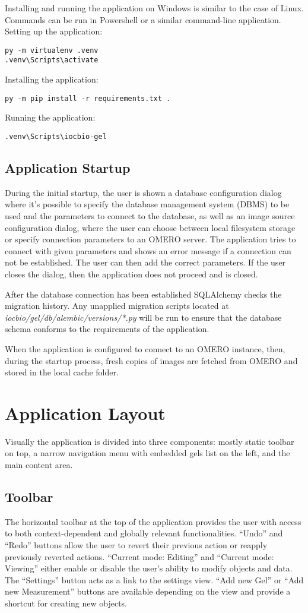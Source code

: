 Installing and running the application on Windows is similar to the case of Linux. Commands can be run in Powershell or a similar command-line application.
Setting up the application:
\begin{verbatim}
py -m virtualenv .venv
.venv\Scripts\activate
\end{verbatim}
Installing the application:
\begin{verbatim}
py -m pip install -r requirements.txt .
\end{verbatim}
Running the application:
\begin{verbatim}
.venv\Scripts\iocbio-gel
\end{verbatim}

\subsection{Application Startup}

During the initial startup, the user is shown a database configuration dialog where it’s possible to specify the database management system (DBMS) to be used and the parameters to connect to the database, as well as an image source configuration dialog, where the user can choose between local filesystem storage or specify connection parameters to an OMERO server. The application tries to connect with given parameters and shows an error message if a connection can not be established. The user can then add the correct parameters. If the user closes the dialog, then the application does not proceed and is closed.

After the database connection has been established SQLAlchemy checks the migration history. Any unapplied migration scripts located at \emph{iocbio/gel/db/alembic/versions/*.py} will be run to ensure that the database schema conforms to the requirements of the application.

When the application is configured to connect to an OMERO instance, then, during the startup process, fresh copies of images are fetched from OMERO and stored in the local cache folder.

\section{Application Layout}
Visually the application is divided into three components: mostly static toolbar on top, a narrow navigation menu with embedded gels list on the left, and the main content area. 

\subsection{Toolbar}
The horizontal toolbar at the top of the application provides the user with access to both context-dependent and globally relevant functionalities. “Undo” and “Redo” buttons allow the user to revert their previous action or reapply previously reverted actions. “Current mode: Editing” and “Current mode: Viewing” either enable or disable the user's ability to modify objects and data. The “Settings” button acts as a link to the settings view. “Add new Gel” or “Add new Measurement” buttons
are available depending on the view and provide a shortcut for creating new objects.

